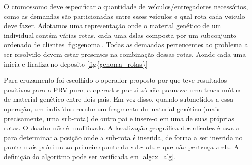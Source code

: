 O cromossomo deve especificar a quantidade de veículos/entregadores necessários, como as demandas são particionadas entre esses veículos e qual rota cada veiculo deve fazer. Adotamos uma representação onde o material genético de um individual contém várias rotas, cada uma delas composta por um subconjunto ordenado de clientes \ref{fig:genoma}. Todas as demandas pertencentes ao problema a ser resolvido devem estar presentes na combinação dessas rotas. Aonde cada uma inicia e finaliza no deposito \ref{fig{genoma_rotas}}

\begin{center}
	\label{fig:genoma}
\end{center}

\begin{center}
	\label{fig:genoma_rotas}
\end{center}

Para cruzamento foi escolhido o operador proposto por \cite{Pereira_Tavares} que teve resultados positivos para o PRV puro, o operador por si só não promove uma troca mútua de material genético entre dois pais. Em vez disso, quando submetidos a essa operação, um indivíduo recebe um fragmento de material genético (mais precisamente, uma sub-rota) de outro pai e insere-o em uma de suas próprias rotas. O doador não é modificado. A localização geográfica dos clientes é usada para determinar a posição onde a sub-rota é inserida, de forma a ser inserida no ponto mais próximo ao primeiro ponto da sub-rota e que não pertença a ela. A definição do algoritmo pode ser verificada em \ref{algcx_alg}.

